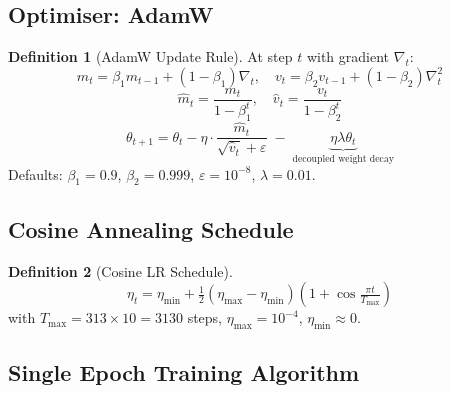 \documentclass[12pt, a4paper]{article}
\theoremstyle{definition}
\newtheorem{definition}{Definition}[section]
\theoremstyle{plain}
\theoremstyle{remark}
\begin{document}
\subsection{Optimiser: AdamW}

\begin{definition}[AdamW Update Rule]
At step $t$ with gradient $\nabla_t$:
\[
  m_t = \beta_1 m_{t-1} + (1-\beta_1)\nabla_t, \quad
  v_t = \beta_2 v_{t-1} + (1-\beta_2)\nabla_t^2
\]
\[
  \hat{m}_t = \frac{m_t}{1-\beta_1^t},\quad
  \hat{v}_t = \frac{v_t}{1-\beta_2^t}
\]
\[
  \theta_{t+1} = \theta_t
  - \eta\cdot\frac{\hat{m}_t}{\sqrt{\hat{v}_t}+\varepsilon}
  \;-\; \underbrace{\eta\lambda\theta_t}_{\text{decoupled weight decay}}
\]
Defaults: $\beta_1=0.9$, $\beta_2=0.999$, $\varepsilon=10^{-8}$, $\lambda=0.01$.
\end{definition}

\subsection{Cosine Annealing Schedule}

\begin{definition}[Cosine LR Schedule]
\[
  \eta_t = \eta_{\min} + \tfrac{1}{2}(\eta_{\max}-\eta_{\min})
  \left(1 + \cos\!\tfrac{\pi t}{T_{\max}}\right)
\]
with $T_{\max} = 313 \times 10 = 3130$ steps, $\eta_{\max}=10^{-4}$,
$\eta_{\min}\approx 0$.
\end{definition}

\subsection{Single Epoch Training Algorithm}
\end{document}
